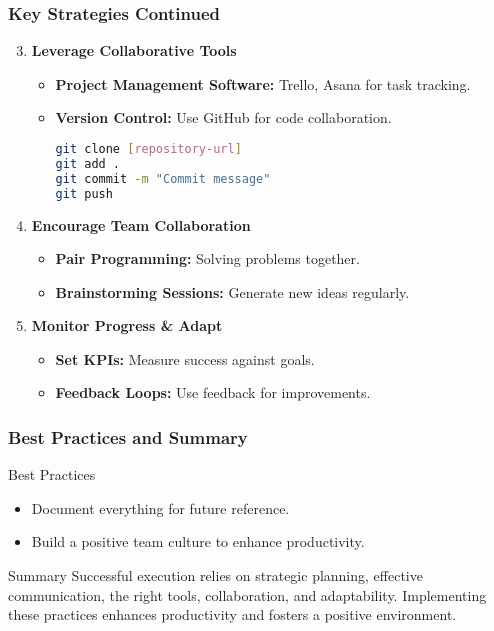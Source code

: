 \documentclass[aspectratio=169]{beamer}
\begin{document}
\begin{frame}[fragile]
    \frametitle{Key Strategies Continued}
    \begin{enumerate}
        \setcounter{enumi}{2} %
        \item \textbf{Leverage Collaborative Tools}
            \begin{itemize}
                \item \textbf{Project Management Software:} Trello, Asana for task tracking.
                \item \textbf{Version Control:} Use GitHub for code collaboration.
                \begin{lstlisting}[language=bash]
git clone [repository-url]
git add .
git commit -m "Commit message"
git push
                \end{lstlisting}
            \end{itemize}

        \item \textbf{Encourage Team Collaboration}
            \begin{itemize}
                \item \textbf{Pair Programming:} Solving problems together.
                \item \textbf{Brainstorming Sessions:} Generate new ideas regularly.
            \end{itemize}
        
        \item \textbf{Monitor Progress \& Adapt}
            \begin{itemize}
                \item \textbf{Set KPIs:} Measure success against goals.
                \item \textbf{Feedback Loops:} Use feedback for improvements.
            \end{itemize}
    \end{enumerate}
\end{frame}

\begin{frame}[fragile]
    \frametitle{Best Practices and Summary}
    \begin{block}{Best Practices}
        \begin{itemize}
            \item Document everything for future reference.
            \item Build a positive team culture to enhance productivity.
        \end{itemize}
    \end{block}
    
    \begin{block}{Summary}
        Successful execution relies on strategic planning, effective communication, the right tools, collaboration, and adaptability. Implementing these practices enhances productivity and fosters a positive environment.
    \end{block}
\end{frame}
\end{document}
